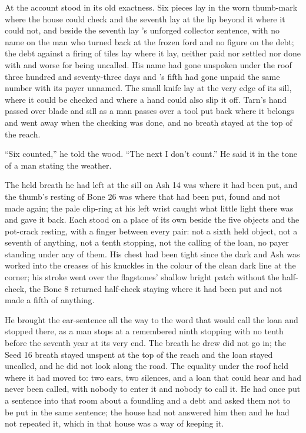 \scenebreak

At  the account stood in its old exactness. Six pieces lay in the worn thumb-mark where the house could check and the seventh lay at the lip beyond it where it could not, and beside the seventh lay 's unforged collector sentence, with no name on the man who turned back at the frozen ford and no figure on the debt; the debt against a firing of tiles lay where it lay, neither paid nor settled nor done with and worse for being uncalled. His name had gone unspoken under the roof three hundred and seventy-three days and 's fifth had gone unpaid the same number with its payer unnamed. The small knife lay at the very edge of its sill, where it could be checked and where a hand could also slip it off. Tarn's hand passed over blade and sill as a man passes over a tool put back where it belongs and went away when the checking was done, and no breath stayed at the top of the reach.

“Six counted,” he told the wood. “The next I don't count.” He said it in the tone of a man stating the weather.

The held breath he had left at the sill on Ash 14 was where it had been put, and the thumb's resting of Bone 26 was where that had been put, found and not made again; the pale clip-ring at his left wrist caught what little light there was and gave it back. Each stood on a place of its own beside the five objects and the pot-crack resting, with a finger between every pair: not a sixth held object, not a seventh of anything, not a tenth stopping, not the calling of the loan, no payer standing under any of them. His chest had been tight since the dark and Ash was worked into the creases of his knuckles in the colour of the clean dark line at the corner; his stroke went over the flagstones' shallow bright patch without the half-check, the Bone 8 returned half-check staying where it had been put and not made a fifth of anything.

He brought the ear-sentence all the way to the word that would call the loan and stopped there, as a man stops at a remembered ninth stopping with no tenth before the seventh year at its very end. The breath he drew did not go in; the Seed 16 breath stayed unspent at the top of the reach and the loan stayed uncalled, and he did not look along the road. The equality under the roof held where it had moved to: two ears, two silences, and a loan that could hear and had never been called, with nobody to enter it and nobody to call it. He had once put a sentence into that room about a foundling and a debt and asked them not to be put in the same sentence; the house had not answered him then and he had not repeated it, which in that house was a way of keeping it.

